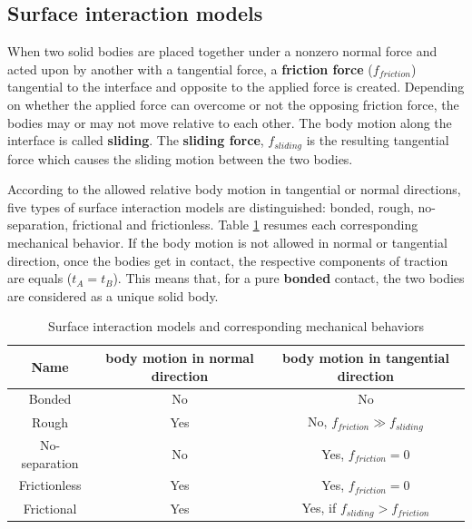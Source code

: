 \subsection{Surface interaction models}%

\label{subsection:surfaceinteractionmodels}
When two solid bodies are placed together under a nonzero normal force and acted upon by another with a tangential force, a \textbf{friction force} ($f_{friction}$) tangential to the interface and opposite to the applied force is created. Depending on whether the applied force can overcome  or not the opposing friction force, the bodies may or may not move relative to each other. The body motion along the interface is called \textbf{sliding}. The \textbf{sliding force}, $f_{sliding}$ is the resulting tangential force which causes the sliding motion between the two bodies.
  
According to the allowed relative body motion in tangential or normal directions, five types of surface interaction models are distinguished: bonded, rough, no-separation, frictional and frictionless. Table \ref{contactB} resumes each corresponding mechanical behavior. If the body motion is not allowed in normal or tangential direction, once the bodies get in contact, the respective components of traction are equals ($t_A=t_B$). This means that, for a pure \textbf{bonded} contact, the two bodies are considered as a unique solid body.    

\begin{table}[H]

\begin{center}
\begin{tabular}{||c|c|c||}
\hline
Name & body motion in normal direction & body motion in tangential direction \\
\hline\hline
Bonded & No & No\\
\hline
Rough & Yes & No, $f_{friction} \gg f_{sliding}$ \\
\hline
No-separation & No & Yes, $f_{friction} = 0$ \\
\hline
Frictionless & Yes & Yes, $f_{friction} = 0$ \\
\hline
Frictional & Yes & Yes, if $f_{sliding} > f_{friction}$\\
\hline
\end{tabular}
\caption{Surface interaction models and corresponding mechanical behaviors}
\label{contactB}
\end{center}
\end{table}

